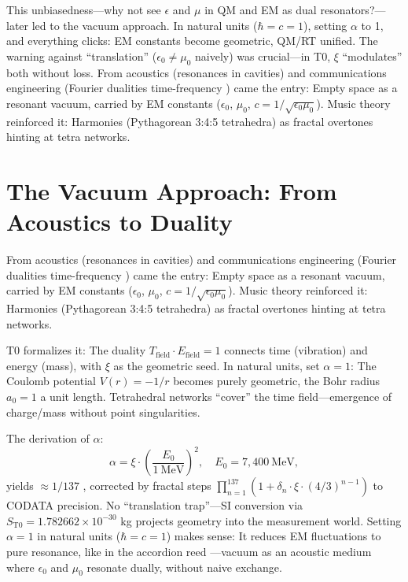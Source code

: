 	This unbiasedness—why not see $\epsilon$ and $\mu$ in QM and EM as dual resonators?—later led to the vacuum approach. In natural units ($\hbar = c = 1$), setting $\alpha$ to 1, and everything clicks: EM constants become geometric, QM/RT unified. The warning against ``translation'' ($\epsilon_0 \neq \mu_0$ naively) was crucial—in T0, $\xi$ ``modulates'' both without loss. From acoustics (resonances in cavities) and communications engineering (Fourier dualities time-frequency \cite{stanfordEE261}) came the entry: Empty space as a resonant vacuum, carried by EM constants ($\epsilon_0$, $\mu_0$, $c = 1/\sqrt{\epsilon_0 \mu_0}$). Music theory reinforced it: Harmonies (Pythagorean 3:4:5 tetrahedra) as fractal overtones hinting at tetra networks.
	
	\section{The Vacuum Approach: From Acoustics to Duality}
	From acoustics (resonances in cavities) and communications engineering (Fourier dualities time-frequency \cite{stanfordEE261}) came the entry: Empty space as a resonant vacuum, carried by EM constants ($\epsilon_0$, $\mu_0$, $c = 1/\sqrt{\epsilon_0 \mu_0}$). Music theory reinforced it: Harmonies (Pythagorean 3:4:5 tetrahedra) as fractal overtones hinting at tetra networks.
	
	T0 formalizes it: The duality $T_{\text{field}} \cdot E_{\text{field}} = 1$ connects time (vibration) and energy (mass), with $\xi$ as the geometric seed. In natural units, set $\alpha = 1$: The Coulomb potential $V(r) = -1/r$ becomes purely geometric, the Bohr radius $a_0 = 1$ a unit length. Tetrahedral networks ``cover'' the time field—emergence of charge/mass without point singularities.
	
	The derivation of $\alpha$:
	\begin{equation}
		\alpha = \xi \cdot \left( \frac{E_0}{1\ \mathrm{MeV}} \right)^2, \quad E_0 = 7{,}400\ \mathrm{MeV},
	\end{equation}
	yields $\approx 1/137$ \cite{codata2022}, corrected by fractal steps $\prod_{n=1}^{137} (1 + \delta_n \cdot \xi \cdot (4/3)^{n-1})$ to CODATA precision. No ``translation trap''—SI conversion via $S_{\mathrm{T0}} = 1.782662 \times 10^{-30}$ kg projects geometry into the measurement world. Setting $\alpha = 1$ in natural units ($\hbar = c = 1$) makes sense: It reduces EM fluctuations to pure resonance, like in the accordion reed \cite{ricot2005}—vacuum as an acoustic medium where $\epsilon_0$ and $\mu_0$ resonate dually, without naive exchange.
	
